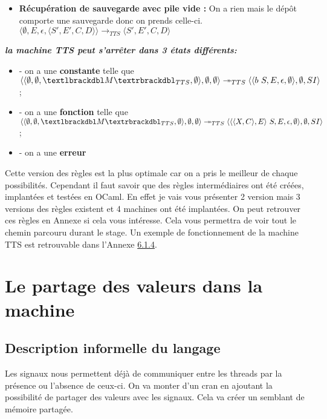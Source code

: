\documentclass[10pt,a4paper]{report}
\begin{document}
\begin{enumerate}
\begin{itemize}
  \item[] \textbf{Récupération de sauvegarde avec pile vide :}  On a rien mais le dépôt comporte une sauvegarde donc on prends celle-ci.
    \smallbreak  
    $\langle \emptyset,E,\epsilon,\langle S',E',C,D\rangle\rangle
    \longrightarrow_{TTS} 
    \langle S',E',C,D\rangle$
  \end{itemize}
\end{enumerate}
\bigbreak
\bigbreak




\textbf{\textit{la machine TTS peut s'arrêter dans 3 états différents:}}
\smallbreak
\begin{itemize}
\item[] - on a une \textbf{constante} telle que 
  $\langle\langle \emptyset,\emptyset,\textlbrackdbl M\textrbrackdbl_{TTS},\emptyset\rangle,\emptyset,\emptyset\rangle 
  \twoheadrightarrow_{TTS} 
  \langle\langle b~S,E,\epsilon,\emptyset\rangle,\emptyset,SI\rangle$;
  
\item[] - on a une \textbf{fonction} telle que
  $\langle\langle \emptyset,\emptyset,\textlbrackdbl M\textrbrackdbl_{TTS},\emptyset\rangle,\emptyset,\emptyset\rangle 
  \twoheadrightarrow_{TTS} 
  \langle\langle\langle X,C\rangle,E\rangle~S,E,\epsilon,\emptyset\rangle,\emptyset,SI\rangle$;
  
\item[] - on a une \textbf{erreur} 
\end{itemize}
\bigbreak
\bigbreak




Cette version des règles est la plus optimale car on a pris le meilleur de chaque possibilités. Cependant il faut savoir que des règles intermédiaires ont été créées, implantées et testées en OCaml. En effet je vais vous présenter 2 version mais 3 versions des règles existent et 4 machines ont été implantées. On peut retrouver ces règles en Annexe si cela vous intéresse. Cela vous permettra de voir tout le chemin parcouru durant le stage. Un exemple de fonctionnement de la machine TTS est retrouvable dans l'Annexe \hyperref[TTS]{6.1.4}.



\section{Le partage des valeurs dans la machine}

\subsection{Description informelle du langage}
Les signaux nous permettent déjà de communiquer entre les threads par la présence ou l'absence de ceux-ci. On va monter d'un cran en ajoutant la possibilité de partager des valeurs avec les signaux. Cela va créer un semblant de mémoire partagée.
\medbreak
\end{document}
